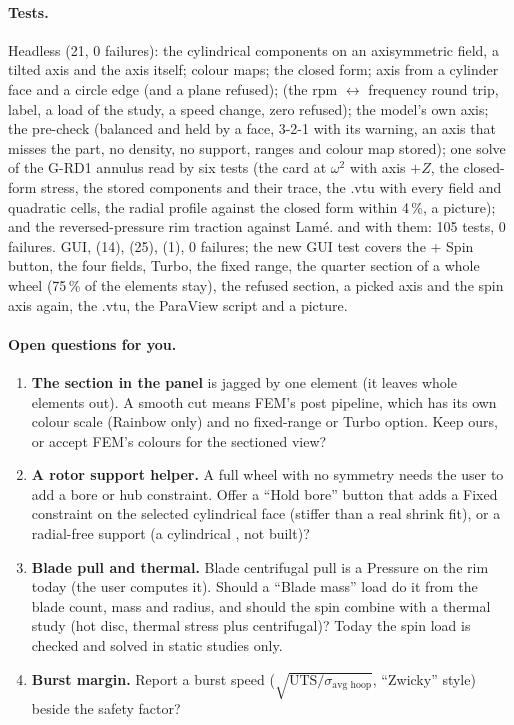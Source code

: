 \paragraph{Tests.} Headless  (21, 0 failures): the cylindrical components on an axisymmetric
field, a tilted axis and the axis itself; colour maps; the closed form; axis from a cylinder face and a circle edge (and a
plane refused);  (the rpm $\leftrightarrow$ frequency round trip, label, a load of the study, a speed change,
zero refused); the model's own axis; the pre-check (balanced and held by a face, 3-2-1 with its warning, an axis that misses
the part, no density, no support, ranges and colour map stored); one solve of the G-RD1 annulus read by six tests (the
 card at $\omega^2$ with axis $+Z$, the closed-form stress, the stored components and their trace, the .vtu with
every field and quadratic cells, the radial profile against the closed form within 4\,\%, a  picture); and the
reversed-pressure rim traction against Lam\'e.  and  with them: 105
tests, 0 failures. GUI,  (14),  (25), 
(1), 0 failures; the new GUI test covers the + Spin button, the four fields, Turbo, the fixed range, the quarter section of a
whole wheel (75\,\% of the elements stay), the refused section, a picked axis and the spin axis again, the .vtu, the ParaView
script and a picture.

\paragraph{Open questions for you.}
\begin{enumerate}[nosep]
  \item \textbf{The section in the panel} is jagged by one element (it leaves whole elements out). A smooth cut means FEM's
        post pipeline, which has its own colour scale (Rainbow only) and no fixed-range or Turbo option. Keep ours, or accept
        FEM's colours for the sectioned view?
  \item \textbf{A rotor support helper.} A full wheel with no symmetry needs the user to add a bore or hub constraint. Offer
        a ``Hold bore'' button that adds a Fixed constraint on the selected cylindrical face (stiffer than a real shrink fit),
        or a radial-free support (a cylindrical , not built)?
  \item \textbf{Blade pull and thermal.} Blade centrifugal pull is a Pressure on the rim today (the user computes it).
        Should a ``Blade mass'' load do it from the blade count, mass and radius, and should the spin combine with a thermal
        study (hot disc, thermal stress plus centrifugal)? Today the spin load is checked and solved in static studies only.
  \item \textbf{Burst margin.} Report a burst speed ($\sqrt{\text{UTS}/\sigma_{\text{avg hoop}}}$, ``Zwicky'' style) beside the
        safety factor?
\end{enumerate}

